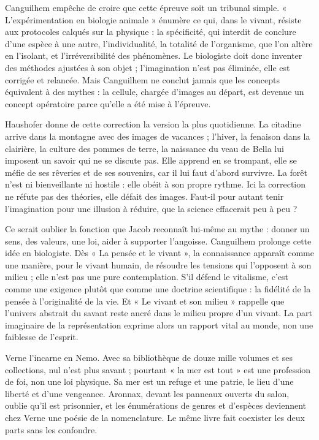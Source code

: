 \documentclass[11pt,a4paper]{article}
\begin{document}
Canguilhem empêche de croire que cette épreuve soit un tribunal simple. « L'expérimentation en biologie animale » énumère ce qui, dans le vivant, résiste aux protocoles calqués sur la physique : la spécificité, qui interdit de conclure d'une espèce à une autre, l'individualité, la totalité de l'organisme, que l'on altère en l'isolant, et l'irréversibilité des phénomènes. Le biologiste doit donc inventer des méthodes ajustées à son objet ; l'imagination n'est pas éliminée, elle est corrigée et relancée. Mais Canguilhem ne conclut jamais que les concepts équivalent à des mythes : la cellule, chargée d'images au départ, est devenue un concept opératoire parce qu'elle a été mise à l'épreuve.

Haushofer donne de cette correction la version la plus quotidienne. La citadine arrive dans la montagne avec des images de vacances ; l'hiver, la fenaison dans la clairière, la culture des pommes de terre, la naissance du veau de Bella lui imposent un savoir qui ne se discute pas. Elle apprend en se trompant, elle se méfie de ses rêveries et de ses souvenirs, car il lui faut d'abord survivre. La forêt n'est ni bienveillante ni hostile : elle obéit à son propre rythme. Ici la correction ne réfute pas des théories, elle défait des images. Faut-il pour autant tenir l'imagination pour une illusion à réduire, que la science effacerait peu à peu ?

Ce serait oublier la fonction que Jacob reconnaît lui-même au mythe : donner un sens, des valeurs, une loi, aider à supporter l'angoisse. Canguilhem prolonge cette idée en biologiste. Dès « La pensée et le vivant », la connaissance apparaît comme une manière, pour le vivant humain, de résoudre les tensions qui l'opposent à son milieu ; elle n'est pas une pure contemplation. S'il défend le vitalisme, c'est comme une exigence plutôt que comme une doctrine scientifique : la fidélité de la pensée à l'originalité de la vie. Et « Le vivant et son milieu » rappelle que l'univers abstrait du savant reste ancré dans le milieu propre d'un vivant. La part imaginaire de la représentation exprime alors un rapport vital au monde, non une faiblesse de l'esprit.

Verne l'incarne en Nemo. Avec sa bibliothèque de douze mille volumes et ses collections, nul n'est plus savant ; pourtant « la mer est tout » est une profession de foi, non une loi physique. Sa mer est un refuge et une patrie, le lieu d'une liberté et d'une vengeance. Aronnax, devant les panneaux ouverts du salon, oublie qu'il est prisonnier, et les énumérations de genres et d'espèces deviennent chez Verne une poésie de la nomenclature. Le même livre fait coexister les deux parts sans les confondre.
\end{document}
